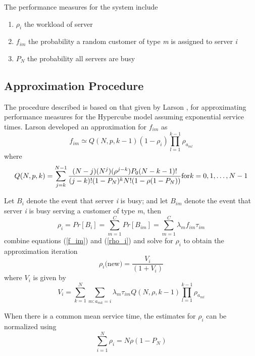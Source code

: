 The performance measures for the system include 
\begin{enumerate}
\item $\rho_i$ the workload of server 
\item $f_{im}$ the probability a random customer of type \textit{m}
  is assigned to server \textit{i}
\item $P_{N}$ the probability all servers are busy
\end{enumerate}

\subsection{Approximation Procedure}
The procedure described is based on that given by
Larson \cite{larson1975approximating},
for approximating performance measures
for the Hypercube model
assuming exponential service times.
Larson developed an approximation for $f_{im}$ as
\begin{equation} \label{f_im}
  f_{im} \simeq Q(N,p,k-1)(1-\rho_{i})\prod_{l=1}^{k-1}{\rho_{a_{ml}}}
\end{equation}
where
\begin{equation} \label{Q}
  Q(N,p,k) =
  \sum_{j=k}^{N-1}{
    \frac{(N-j)(N^j)(\rho^{j-k})P_0(N-k-1)!}
         {(j-k)!(1-P_N)^kN!(1-\rho(1-P_N))}
  } \\
  \hfill \mbox{for} k = 0,1,\ldots,N-1
\end{equation}

Let $B_i$ denote the event
that server \textit{i} is busy;
and let $B_{im}$ denote the event
that server \textit{i} is busy
serving a customer of type \textit{m}, then
\begin{equation} \label{rho_i}
  \rho_{i} = 
  Pr\left[B_i\right] = 
  \sum_{m=1}^{C}{
    Pr\left[B_{im}\right]} =
  \sum_{m=1}^{C}{
    \lambda_{m}f_{im}\tau_{im}
  }
\end{equation}
combine equations (\ref{f_im}) and (\ref{rho_i})
and solve for $\rho_i$ to obtain the approximation iteration
\begin{equation}
  \rho_i\mbox{(new)} =
  \frac{V_i}
       {(1+V_i)}
\end{equation}
where $V_i$ is given by
\begin{equation} \label{V_i}
  V_i = \sum_{k=1}^{N}{\sum_{m:a_{mk}=i}{\lambda_m \tau_{im} Q(N,\rho,k-1)\prod_{l=1}^{k-1}{\rho_{a_{ml}}}}}
\end{equation}

When there is a common mean service time, the estimates for $\rho_i$ can be normalized using
\begin{equation} \label{P_N}
  \sum_{i=1}^{N}{\rho_i} = N \rho (1 - P_{N})
\end{equation}

